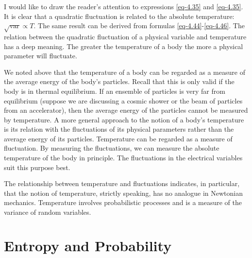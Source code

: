  I would like to draw the reader's
attention to expressions \eqref{eq-4.35} and \eqref{eq-4.35}. It is clear that a quadratic fluctuation is related to the absolute temperature: $\sqrt{\text{var}} \propto T$. The same result can be derived from formulas \eqref{eq-4.44}-\eqref{eq-4.46}. The relation between the quadratic fluctuation of a physical variable and temperature has a deep meaning. The greater the temperature of a body the more a physical parameter will fluctuate.

We noted above that the temperature of a body can be regarded as a measure of the average energy of the body's particles. Recall that this is only valid if the body is in thermal equilibrium. If an ensemble of particles is very far from equilibrium (suppose we are discussing a cosmic shower or the beam of particles from an accelerator), then the average energy of the particles cannot be measured by temperature. A more general approach to the notion of a body's temperature is its relation with the fluctuations of its physical parameters rather than the average energy of its particles. Temperature can be regarded as a measure of fluctuation. By measuring the fluctuations, we can measure the absolute temperature of the body in principle. The fluctuations in the electrical variables suit this purpose best.

The relationship between temperature and fluctuations indicates, in particular, that the notion of temperature, strictly speaking, has no analogue in Newtonian mechanics. Temperature involves probabilistic processes and is a measure of the variance of random variables.

\section{Entropy and Probability }

